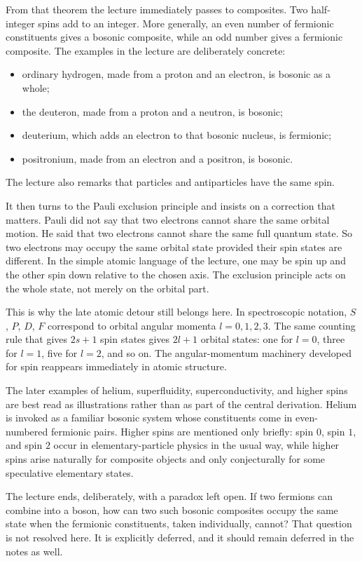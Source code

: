From that theorem the lecture immediately passes to composites. Two half-integer spins add to an integer. More generally, an even number of fermionic constituents gives a bosonic composite, while an odd number gives a fermionic composite. The examples in the lecture are deliberately concrete:
\begin{itemize}
\item ordinary hydrogen, made from a proton and an electron, is bosonic as a whole;
\item the deuteron, made from a proton and a neutron, is bosonic;
\item deuterium, which adds an electron to that bosonic nucleus, is fermionic;
\item positronium, made from an electron and a positron, is bosonic.
\end{itemize}
The lecture also remarks that particles and antiparticles have the same spin.

It then turns to the Pauli exclusion principle and insists on a correction that matters. Pauli did not say that two electrons cannot share the same orbital motion. He said that two electrons cannot share the same full quantum state. So two electrons may occupy the same orbital state provided their spin states are different. In the simple atomic language of the lecture, one may be spin up and the other spin down relative to the chosen axis. The exclusion principle acts on the whole state, not merely on the orbital part.

This is why the late atomic detour still belongs here. In spectroscopic notation, \(S\), \(P\), \(D\), \(F\) correspond to orbital angular momenta \(l=0,1,2,3\). The same counting rule that gives \(2s+1\) spin states gives \(2l+1\) orbital states: one for \(l=0\), three for \(l=1\), five for \(l=2\), and so on. The angular-momentum machinery developed for spin reappears immediately in atomic structure.

The later examples of helium, superfluidity, superconductivity, and higher spins are best read as illustrations rather than as part of the central derivation. Helium is invoked as a familiar bosonic system whose constituents come in even-numbered fermionic pairs. Higher spins are mentioned only briefly: spin \(0\), spin \(1\), and spin \(2\) occur in elementary-particle physics in the usual way, while higher spins arise naturally for composite objects and only conjecturally for some speculative elementary states.

The lecture ends, deliberately, with a paradox left open. If two fermions can combine into a boson, how can two such bosonic composites occupy the same state when the fermionic constituents, taken individually, cannot? That question is not resolved here. It is explicitly deferred, and it should remain deferred in the notes as well.

